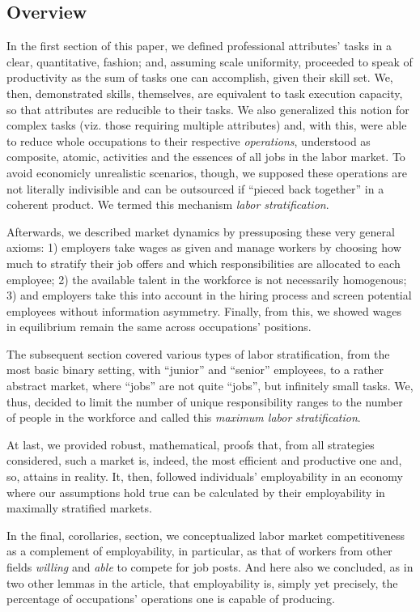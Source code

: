 \documentclass[hidelinks, nonatbib]{elsarticle}
\begin{document}
\subsection{Overview}
In the first section of this paper, we defined professional attributes' tasks in a clear, quantitative, fashion; and, assuming scale uniformity, proceeded to speak of productivity as the sum of tasks one can accomplish, given their skill set. We, then, demonstrated skills, themselves, are equivalent to task execution capacity, so that attributes are reducible to their tasks. We also generalized this notion for complex tasks (viz. those requiring multiple attributes) and, with this, were able to reduce whole occupations to their respective \textit{operations}, understood as composite, atomic, activities and the essences of all jobs in the labor market. To avoid economicly unrealistic scenarios, though, we supposed these operations are not literally indivisible and can be outsourced if ``pieced back together'' in a coherent product. We termed this mechanism \textit{labor stratification}.

Afterwards, we described market dynamics by pressuposing these very general axioms: 1) employers take wages as given and manage workers by choosing how much to stratify their job offers and which responsibilities are allocated to each employee; 2) the available talent in the workforce is not necessarily homogenous; 3) and employers take this into account in the hiring process and screen potential employees without information asymmetry. Finally, from this, we showed wages in equilibrium remain the same across occupations' positions.

The subsequent section covered various types of labor stratification, from the most basic binary setting, with ``junior'' and ``senior'' employees, to a rather abstract market, where ``jobs'' are not quite ``jobs'', but infinitely small tasks. We, thus, decided to limit the number of unique responsibility ranges to the number of people in the workforce and called this \textit{maximum labor stratification}.

At last, we provided robust, mathematical, proofs that, from all strategies considered, such a market is, indeed, the most efficient and productive one and, so, attains in reality. It, then, followed individuals' employability in an economy where our assumptions hold true can be calculated by their employability in maximally stratified markets.

In the final, corollaries, section, we conceptualized labor market competitiveness as a complement of employability, in particular, as that of workers from other fields \textit{willing} and \textit{able} to compete for job posts. And here also we concluded, as in two other lemmas in the article, that employability is, simply yet precisely, the percentage of occupations' operations one is capable of producing.
\end{document}
